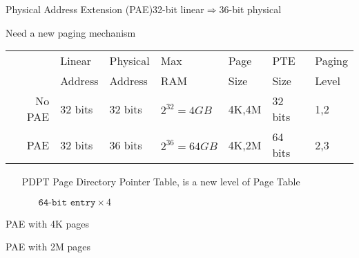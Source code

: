 \begin{frame}{Physical Address Extension (PAE)}{32-bit linear$\Rightarrow{}$36-bit physical}
  \begin{block}{Need a new paging mechanism}
    \begin{scriptsize}
      \begin{center}
        \begin{tabular}{r|llllll}
          &Linear&Physical&Max&Page&PTE&Paging\\
          &Address&Address&RAM&Size&Size&Level\\\hline
          No PAE&32 bits&32 bits&$2^{32}=4GB$&4K,4M&32 bits&1,2\\
          PAE&32 bits&36 bits&$2^{36}=64GB$&4K,2M&64 bits&2,3
        \end{tabular}
      \end{center}
    \end{scriptsize}
  \end{block}
  \vspace{1em}
  \begin{varwidth}{.49\textwidth}
    \begin{itemize}
    \item[PDPT] Page Directory Pointer Table, is a new level of Page Table
      \begin{itemize}
      \item[] $\texttt{64-bit entry}\times{}4$
      \end{itemize}
    \end{itemize}
  \end{varwidth}\hfill
  \begin{varwidth}{.49\textwidth}
    \begin{center}
    \end{center}
  \end{varwidth}
\end{frame}

\begin{frame}{PAE with 4K pages}
  \begin{center}
  \end{center}
\end{frame}

\begin{frame}{PAE with 2M pages}
  \begin{center}
  \end{center}
\end{frame}

